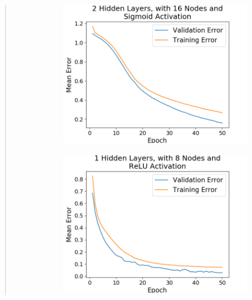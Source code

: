 \documentclass{article}
\begin{document}
\begin{quote}
\begin{figure}[h]
\begin{subfigure}[h]{0.23\textwidth}
		\includegraphics[width=\textwidth]{figs/Iris_Multiclass_Classification_2_Hidden_Layers_with_16_Nodes_and_Sigmoid_Activation.png}
	\end{subfigure}
\end{figure}	
\begin{figure}[h]
	\centering
	\begin{subfigure}[h]{0.23\textwidth}
		\includegraphics[width=\textwidth]{figs/Iris_Multiclass_Classification_1_Hidden_Layers_with_8_Nodes_and_ReLU_Activation.png}
	\end{subfigure}
	\begin{subfigure}[h]{0.23\textwidth}

\end{subfigure}
\end{figure}
\end{quote}
\end{document}
